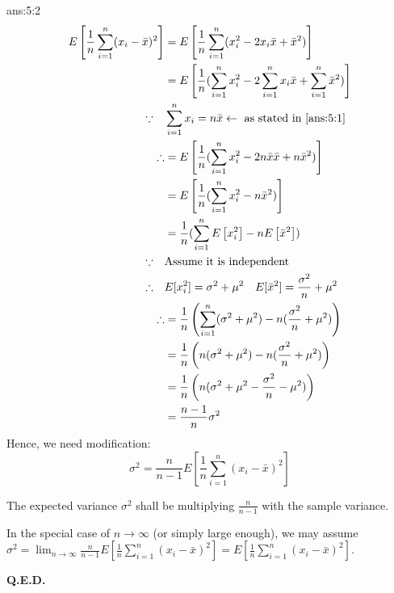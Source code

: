 \documentclass{tron}
\begin{document}
\newpage
\begin{answer}[]{ans:5:2}
	\begin{align}
		E\left[ \frac1n \sum_{i=1}^n (x_i - \bar{x})^2 \right] 
		&= E\left[ \frac1n \sum_{i=1}^n (x_i^2 - 2 x_i \bar{x} + \bar{x}^2) \right] \\
		&= E\left[ \frac1n (\sum_{i=1}^n x_i^2 - 2 \sum_{i=1}^n x_i \bar{x} + \sum_{i=1}^n \bar{x}^2) \right] \\
	\because \quad & \sum_{i=1}^n x_i = n \bar{x} \leftarrow \text{ as stated in \Cref{ans:5:1}}\\
	\therefore &= E\left[ \frac1n (\sum_{i=1}^n x_i^2 - 2 n \bar{x} \bar{x} + n \bar{x}^2) \right] \\	
		&= E\left[ \frac1n (\sum_{i=1}^n x_i^2 - n \bar{x}^2) \right] \\	
		&= \frac1n (\sum_{i=1}^n E\left[ x_i^2 \right] -  n E\left[\bar{x}^2 \right]) \\
	\because \quad & \text{Assume it is independent} \\
	\therefore \quad & E[x_i^2] = \sigma^2 + \mu^2 \quad E[\bar{x}^2] = \frac{\sigma^2}{n} + \mu^2\\
	\therefore	&= \frac1n \left(\sum_{i=1}^n (\sigma^2 + \mu^2) -  n (\frac{\sigma^2}{n} + \mu^2) \right) \\
		&= \frac1n \left(n (\sigma^2 + \mu^2) -  n (\frac{\sigma^2}{n} + \mu^2) \right) \\
		&= \frac1n \left(n (\sigma^2 + \mu^2 - \frac{\sigma^2}{n} - \mu^2) \right) \\
		&= \frac{n-1}{n} \sigma^2 \\
	\end{align}
	Hence, we need modification:
	\begin{equation}
		\sigma^2 = \frac{n}{n-1}  E\left[ \frac1n \sum_{i=1}^n (x_i - \bar{x})^2 \right] 
	\end{equation}
	
	The expected variance $\sigma^2$ shall be multiplying $\frac{n}{n-1}$ with the sample variance.

	In the special case of $n \rightarrow \infty$ (or simply large enough), we may assume $\sigma^2 = \lim_{n\rightarrow\infty} \frac{n}{n-1}  E\left[ \frac1n \sum_{i=1}^n (x_i - \bar{x})^2 \right] = E\left[ \frac1n \sum_{i=1}^n (x_i - \bar{x})^2 \right]$.
	
	\textbf{Q.E.D.}
\end{answer}

\end{document}

